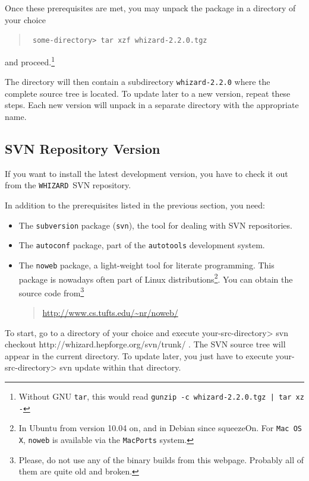 \documentclass[12pt]{book}
\newenvironment{interaction}%
  {\begingroup\small
   \verbatim}%
  {\endverbatim
   \endgroup\noindent}
\newcommand{\ttt}[1]{\texttt{#1}}
\newcommand{\whizard}{\texttt{WHIZARD}}
\newcommand{\thisversion}{2.2.0}
\begin{document}
Once these prerequisites are met, you may unpack the package in a
directory of your choice
\begin{quote}\small\tt
  some-directory> tar xzf whizard-\thisversion.tgz
\end{quote}
and proceed.\footnote{Without GNU \ttt{tar}, this would read \ttt{\small gunzip -c whizard-\thisversion.tgz | tar xz -}}

The directory will then contain a subdirectory \ttt{whizard-\thisversion}
where the complete source tree is located.  To update later to a new
version, repeat these steps.  Each new version will unpack in a
separate directory with the appropriate name.


\subsection{SVN Repository Version}

If you want to install the latest development version, you have to
check it out from the \whizard\ SVN repository.

In addition to the prerequisites listed in the previous section, you
need:
\begin{itemize}
\item
  The \ttt{subversion} package (\ttt{svn}), the tool for dealing with
  SVN repositories.
\item
  The \ttt{autoconf} package, part of the \ttt{autotools} development
  system.
\item
  The \ttt{noweb} package, a light-weight tool for literate programming.  This
  package is nowadays often part of Linux distributions\footnote{In
    Ubuntu from version 10.04 on, and in Debian since
    squeezeOn. For \ttt{Mac OS X}, \ttt{noweb} is available via the
    \ttt{MacPorts} system.}.  You can obtain the source code
  from\footnote{Please, do not use any of the binary builds from this
    webpage. Probably all of them are quite old and broken.}  
  \begin{quote}
    \url{http://www.cs.tufts.edu/~nr/noweb/}
  \end{quote}
\end{itemize}
To start, go to a directory of your choice and execute
\begin{interaction}
  your-src-directory> svn checkout http://whizard.hepforge.org/svn/trunk/ .
\end{interaction}
The SVN source tree will appear in the current directory.  To update
later, you just have to execute
\begin{interaction}
  your-src-directory> svn update
\end{interaction}
within that directory.
\end{document}

